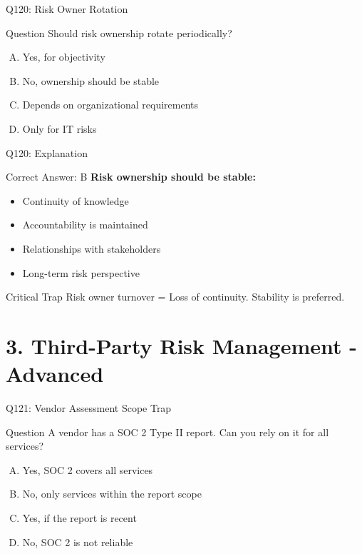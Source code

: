 \documentclass{beamer}
\begin{document}
	\begin{frame}{Q120: Risk Owner Rotation}
		\begin{block}{Question}
			Should risk ownership rotate periodically?
		\end{block}
		\begin{enumerate}[(A)]
			\item Yes, for objectivity
			\item No, ownership should be stable
			\item Depends on organizational requirements
			\item Only for IT risks
		\end{enumerate}
	\end{frame}
	
	\begin{frame}{Q120: Explanation}
		\begin{block}{Correct Answer: B}
			\textbf{Risk ownership should be stable:}
			\begin{itemize}
				\item Continuity of knowledge
				\item Accountability is maintained
				\item Relationships with stakeholders
				\item Long-term risk perspective
			\end{itemize}
		\end{block}
		\begin{alertblock}{Critical Trap}
			Risk owner turnover = Loss of continuity.
			Stability is preferred.
		\end{alertblock}
	\end{frame}
	
	
	\section{3. Third-Party Risk Management - Advanced}
	
	\begin{frame}{Q121: Vendor Assessment Scope Trap}
		\begin{block}{Question}
			A vendor has a SOC 2 Type II report. Can you rely on it for all services?
		\end{block}
		\begin{enumerate}[(A)]
			\item Yes, SOC 2 covers all services
			\item No, only services within the report scope
			\item Yes, if the report is recent
			\item No, SOC 2 is not reliable
		\end{enumerate}
	\end{frame}
	
\end{document}
